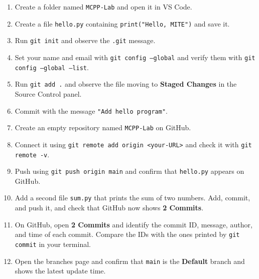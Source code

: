 \documentclass[11pt,a4paper]{article}
\newcommand{\code}[1]{\texttt{#1}}
\begin{document}
\begin{enumerate}
\item Create a folder named \code{MCPP-Lab} and open it in VS Code.
\item Create a file \code{hello.py} containing \code{print("Hello, MITE")} and save it.
\item Run \code{git init} and observe the \code{.git} message.
\item Set your name and email with \code{git config --global} and verify them with \code{git config --global --list}.
\item Run \code{git add .} and observe the file moving to \textbf{Staged Changes} in the Source Control panel.
\item Commit with the message \code{"Add hello program"}.
\item Create an empty repository named \code{MCPP-Lab} on GitHub.
\item Connect it using \code{git remote add origin <your-URL>} and check it with \code{git remote -v}.
\item Push using \code{git push origin main} and confirm that \code{hello.py} appears on GitHub.
\item Add a second file \code{sum.py} that prints the sum of two numbers. Add, commit, and push it, and check that GitHub now shows \textbf{2 Commits}.
\item On GitHub, open \textbf{2 Commits} and identify the commit ID, message, author, and time of each commit. Compare the IDs with the ones printed by \code{git commit} in your terminal.
\item Open the branches page and confirm that \code{main} is the \textbf{Default} branch and shows the latest update time.
\end{enumerate}
\end{document}
